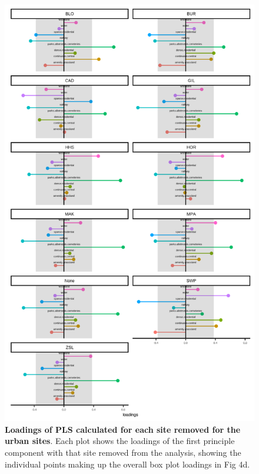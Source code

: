 \documentclass[12pt,letter]{amsart}
\begin{document}
\begin{figure}[h]
	\centering
	\includegraphics{../results/figures/SI_figures/urban_jk_individual_loadings.png}
	\caption{\textbf{Loadings of PLS calculated for each site removed for the urban sites}. Each plot shows the loadings of the first principle component with that site removed from the analysis, showing the individual points making up the overall box plot loadings in Fig 4d.}
\end{figure}
\end{document}
